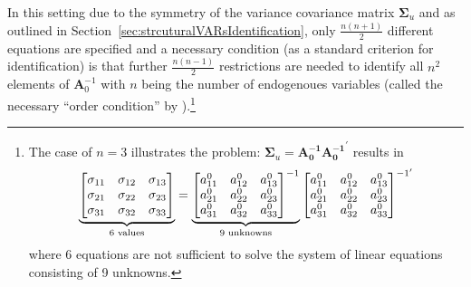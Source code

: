 \documentclass[a4paper,11pt,listof=nochaptergap,oneside,pointednumbers,bibtotoc,bigheadings,liststotoc]{scrbook}
\theoremstyle{mysatz}
\theoremstyle{mydefinition}
\theoremstyle{mytheorem}
\theoremstyle{mybemerkung}
\newcommand{\vect}[1]{\boldsymbol{\mathbf{#1}}}
\begin{document}
In this setting due to the symmetry of the variance covariance matrix $\vect{\Sigma}_u$ and as outlined in Section~\ref{sec:strcuturalVARsIdentification}, only $\frac{n(n+1)}{2}$ different equations are specified and a necessary condition (as a standard criterion for identification) is that further $\frac{n(n-1)}{2}$ restrictions are needed to identify all $n^2$ elements of $\vect{A}_0^{-1}$ with $n$ being the number of endogenoues variables (called the necessary ``order condition'' by \citealp{rothenberg:71}).\footnote{The case of $n=3$ illustrates the problem: $\vect{\Sigma}_u = \vect{A_{0}^{-1}} \vect{A_{0}^{-1}}^'$ results in $$		
		\underbrace{%
		\begin{bmatrix}
    		\sigma_{11} & \sigma_{12} & \sigma_{13} \\
		\sigma_{21} & \sigma_{22} & \sigma_{23} \\
		\sigma_{31} & \sigma_{32} & \sigma_{33}
 		\end{bmatrix}
}_{\text{6 values}} = \underbrace{%
		\begin{bmatrix}
    		a_{11}^0 & a_{12}^0 & a_{13}^0 \\
		a_{21}^0 & a_{22}^0 & a_{23}^0 \\
		a_{31}^0 & a_{32}^0 & a_{33}^0
 		\end{bmatrix}^{-1}
}_{\text{9 unknowns}}
\begin{bmatrix}
    		a_{11}^0 & a_{12}^0 & a_{13}^0 \\
		a_{21}^0 & a_{22}^0 & a_{23}^0 \\
		a_{31}^0 & a_{32}^0 & a_{33}^0
 		\end{bmatrix}^{{-1}'}$$ 
		where 6 equations are not sufficient to solve the system of linear equations consisting of 9 unknowns.}
		
\end{document}
